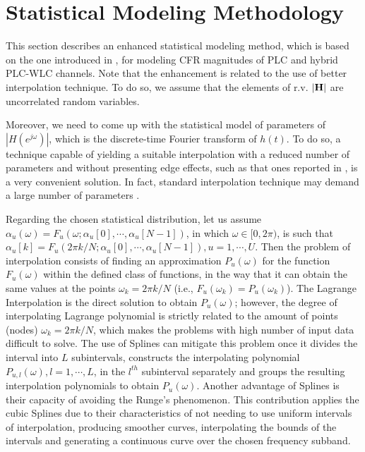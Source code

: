 \documentclass[journal]{IEEEtran}
\begin{document}
\section{Statistical Modeling Methodology}

This section describes an enhanced statistical modeling method, which is based on the one introduced in \cite{Luis:AI}, for modeling \ac{CFR} magnitudes of \ac{PLC} and hybrid \ac{PLC}-\ac{WLC} channels. Note that the enhancement is related to the use of better interpolation technique. To do so, we assume that the elements of \ac{r.v.} ${\bf |H|}$ are uncorrelated random variables. 

Moreover, we need to come up with the statistical model of parameters of $|H(e^{j\omega})|$, which is the discrete-time Fourier transform of $h(t)$. To do so, a technique capable of yielding a suitable interpolation with a reduced number of parameters and without presenting edge effects, such as that ones reported in \cite{Luis:AI}, is a very convenient solution. In fact, standard interpolation technique may demand a large number of parameters \cite{mitra}. 

Regarding the chosen statistical distribution, let us assume  $\alpha_u (\omega) = F_u(\omega; \alpha_{u}[0], \cdots, \alpha_{u}[N-1])$, in which $\omega \in [0,2\pi)$, is such that $\alpha_{u}[k] = F_u(2\pi k/N; \alpha_{u}[0], \cdots, \alpha_{u}[N-1]),u=1,\cdots,U$. Then the problem of interpolation consists of finding an approximation $P_u(\omega)$ for the function $F_u(\omega)$ within the defined class of functions, in the way that it can obtain the same values at the points $\omega_k = 2\pi k/N$ (i.e., $F_u(\omega_k)=P_u(\omega_k)$). The Lagrange Interpolation is the direct solution to obtain $P_u(\omega)$; however, the degree of interpolating Lagrange polynomial is strictly related to the amount of points (nodes)  $\omega_k = 2\pi k/N$, which makes the problems with high number of input data difficult to solve. The use of Splines can mitigate this problem once it divides the interval into $L$ subintervals, constructs the interpolating polynomial $P_{u,l}(\omega),l=1,\cdots,L$, in the $l^{th}$ subinterval separately and groups the resulting interpolation polynomials to obtain $P_u(\omega)$. Another advantage of Splines is their capacity of avoiding the Runge's phenomenon. This contribution applies the cubic Splines \cite{Spline} due to their characteristics of not needing to use uniform intervals of interpolation, producing smoother curves, interpolating the bounds of the intervals and generating a continuous curve over the chosen frequency subband.  
\end{document}
